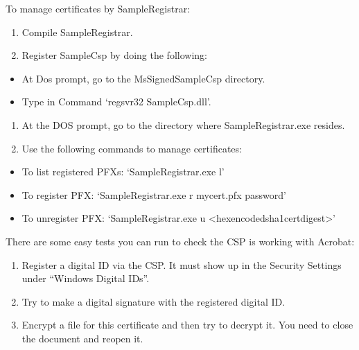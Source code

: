 \documentclass[letterpaper,12pt,english,openany,oneside]{sphinxmanual}
\begin{document}
To manage certificates by SampleRegistrar:
\begin{enumerate}
%
\item {} 
Compile SampleRegistrar.

\item {} 
Register SampleCsp by doing the following:

\end{enumerate}
\begin{itemize}
\item {} 
At Dos prompt, go to the MsSignedSampleCsp directory.

\item {} 
Type in Command ‘regsvr32 SampleCsp.dll’.

\end{itemize}
\begin{enumerate}
%
\setcounter{enumi}{2}
\item {} 
At the DOS prompt, go to the directory where SampleRegistrar.exe resides.

\item {} 
Use the following commands to manage certificates:

\end{enumerate}
\begin{itemize}
\item {} 
To list registered PFXs: ‘SampleRegistrar.exe \sphinxhyphen{}l’

\item {} 
To register PFX: ‘SampleRegistrar.exe \sphinxhyphen{}r mycert.pfx password’

\item {} 
To un\sphinxhyphen{}register PFX: ‘SampleRegistrar.exe \sphinxhyphen{}u <hex\sphinxhyphen{}encoded\sphinxhyphen{}sha1\sphinxhyphen{}cert\sphinxhyphen{}digest>’

\end{itemize}

There are some easy tests you can run to check the CSP is working with Acrobat:
\begin{enumerate}
%
\item {} 
Register a digital ID via the CSP. It must show up in the Security Settings under “Windows Digital IDs”.

\item {} 
Try to make a digital signature with the registered digital ID.

\item {} 
Encrypt a file for this certificate and then try to decrypt it. You need to close the document and reopen it.

\end{enumerate}
\end{document}

